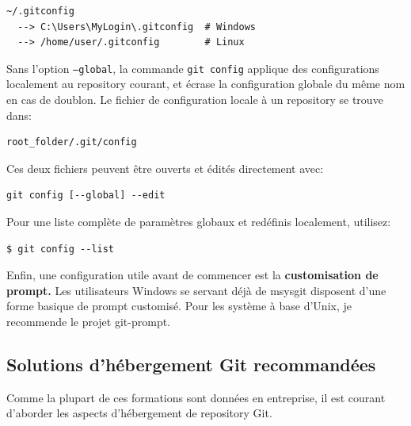 \documentclass[a4paper]{../../common/tufte-latex/tufte-handout}
\begin{document}
\begin{lstlisting}[style=BashInputStyle]
  ~/.gitconfig
  --> C:\Users\MyLogin\.gitconfig  # Windows
  --> /home/user/.gitconfig        # Linux
\end{lstlisting}

Sans l'option \texttt{--global}, la commande \texttt{git config} applique des configurations localement au repository courant, et écrase la configuration globale du même nom en cas de doublon. Le fichier de configuration locale à un repository se trouve dans:

\begin{lstlisting}[style=BashInputStyle]
  root_folder/.git/config
\end{lstlisting}

\noindent Ces deux fichiers peuvent être ouverts et édités directement avec: 

\begin{lstlisting}[style=BashInputStyle]
  git config [--global] --edit
\end{lstlisting}

\noindent Pour une liste complète de paramètres globaux et redéfinis localement, utilisez:

\begin{lstlisting}[style=BashInputStyle]
  $ git config --list
\end{lstlisting}

Enfin, une configuration utile avant de commencer est la \textbf{customisation de prompt.}
Les utilisateurs Windows se servant déjà de msysgit disposent d'une forme basique de prompt customisé. 
Pour les système à base d'Unix, je recommende le projet git-prompt.


\subsection{Solutions d'hébergement Git recommandées}

Comme la plupart de ces formations sont données en entreprise, il est courant d'aborder les aspects d'hébergement de repository Git.
\end{document}

